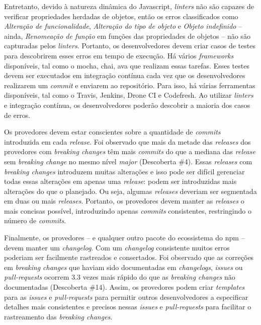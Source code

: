 Entretanto, devido à natureza dinâmica do \textsf{Javascript}, \textit{linters} não são capazes de verificar propriedades herdadas de objetos, então os erros classificados como \textit{Alteração de funcionalidade}, \textit{Alteração do tipo de objeto} e \textit{Objeto indefinido} -- ainda, \textit{Renomeação de função} em funções das propriedades de objetos -- não são capturadas pelos \textit{linters}. Portanto, os desenvolvedores devem criar casos de testes para descobrirem esses erros em tempo de execução. Há vários \textit{frameworks} disponíveis, tal como o \textsf{mocha}, \textsf{chai}, \textsf{ava} que realizam essas tarefas. Esses testes devem ser executados em integração contínua cada vez que os desenvolvedores realizarem um \textit{commit} e enviarem ao repositório. Para isso, há várias ferramentas disponíveis, tal como o \textsf{Travis}, \textsf{Jenkins}, \textsf{Drone CI} e \textsf{Codefresh}. Ao utilizar \textit{linters} e integração contínua, os desenvolvedores poderão descobrir a maioria dos casos de erros.

Os provedores devem estar conscientes sobre a quantidade de \textit{commits} introduzida em cada \textit{release}. Foi observado que mais da metade das \textit{releases} dos provedores com \textit{breaking changes} têm mais \textit{commits} do que a mediana das \textit{release} sem \textit{breaking change} no mesmo nível \textit{major} (Descoberta \#4). Essas \textit{releases} com \textit{breaking changes} introduzem muitas alterações e isso pode ser difícil gerenciar todas essas alterações em apenas uma \textit{release}: podem ser introduzidas mais alterações do que o planejado. Ou seja, algumas \textit{releases} deveriam ser segmentada em duas ou mais \textit{releases}. Portanto, os provedores devem manter as \textit{releases} o mais concisas possível, introduzindo apenas \textit{commits} consistentes, restringindo o número de \textit{commits}.

Finalmente, os provedores -- e qualquer outro pacote do ecossistema do \textsf{npm} -- devem manter um \textit{changelog}. Com um \textit{changelog} consistente muitos erros poderiam ser facilmente rastreados e consertados. Foi observado que as correções em \textit{breaking changes} que haviam sido documentadas em \textit{changelogs}, \textit{issues} ou \textit{pull-requests} ocorrem 3.3 vezes mais rápido do que as \textit{breaking changes} não documentadas (Descoberta \#14). Assim, os provedores podem criar \textit{templates} para as \textit{issues} e \textit{pull-requests} para permitir outros desenvolvedores a especificar detalhes mais consistentes e precisos nessas \textit{issues} e \textit{pull-requests} para facilitar o rastreamento das \textit{breaking changes}.

